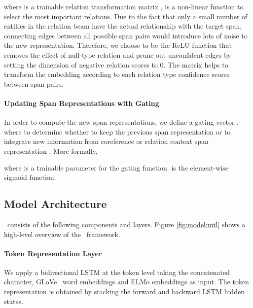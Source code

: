 where  is a trainable relation transformation matrix ,  
 is a non-linear function to select the most important relations. Due to the fact that only a small number of entities in the relation beam have the actual relationship with the target span, connecting edges between all possible span pairs would introduce lots of noise to the new representation.
Therefore, we choose  to be the ReLU function  that  removes the effect of null-type relation and prune out unconfident edges by setting the dimension of negative relation scores  to 0.    The matrix  helps to transform the embedding  according to each relation type confidence scores between span pairs. 

\paragraph{Updating Span Representations with Gating} In order to compute the new span representations, we define a gating vector , where  to determine whether to keep the previous span representation  or to integrate new information from coreference or relation context span representation . More formally, 

where  is a trainable parameter for the gating function.  is the element-wise sigmoid function.


\subsection{Model Architecture}
\label{sec:model_architecture}
\sys\ consists of the following components and layers. Figure \ref{fig:model:mtl} shows a high-level overview of the \sys\ framework. 


\paragraph{Token Representation Layer}
We apply a bidirectional LSTM at the token level taking the concatenated character, GLoVe~\cite{pennington2014glove} word embeddings and ELMo embeddings \cite{peters2018deep} as input. The token representation is obtained by stacking the forward and backward LSTM hidden states.


